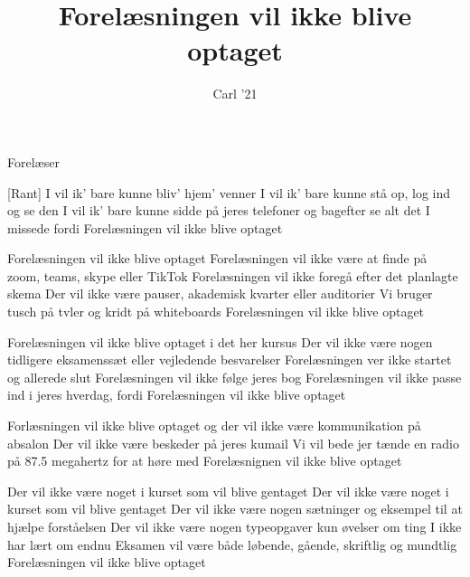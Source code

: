 \documentclass[a4paper,11pt]{article}
\title{Forelæsningen vil ikke blive optaget}
\author{Carl '21}
\begin{document}
\maketitle

\begin{roles}
 Forelæser
\end{roles}


\begin{song}


[Rant] I vil ik' bare kunne bliv' hjem' venner
    I vil ik' bare kunne stå op, log ind og se den
    I vil ik' bare kunne sidde på jeres telefoner
    og bagefter se alt det I missede fordi
    Forelæsningen vil ikke blive optaget

    Forelæsningen vil ikke blive optaget
    Forelæsningen vil ikke være at finde på zoom, teams, skype eller TikTok
    Forelæsningen vil ikke foregå efter det planlagte skema
    Der vil ikke være pauser, akademisk kvarter eller auditorier
    Vi bruger tusch på tvler og kridt på whiteboards
    Forelæsningen vil ikke blive optaget

    Forelæsningen vil ikke blive optaget i det her kursus
    Der vil ikke være nogen tidligere eksamenssæt eller vejledende besvarelser
    Forelæsningen ver ikke startet og allerede slut
    Forelæsningen vil ikke følge jeres bog
    Forelæsningen vil ikke passe ind i jeres hverdag, fordi
    Forelæsningen vil ikke blive optaget

    Forlæsningen vil ikke blive optaget og der vil ikke være kommunikation på absalon
    Der vil ikke være beskeder på jeres kumail
    Vi vil bede jer tænde en radio på 87.5 megahertz for at høre med
    Forelæsnignen vil ikke blive optaget

    Der vil ikke være noget i kurset som vil blive gentaget
    Der vil ikke være noget i kurset som vil blive gentaget
    Der vil ikke være nogen sætninger og eksempel til at hjælpe forståelsen
    Der vil ikke være nogen typeopgaver kun øvelser om ting I ikke har lært om endnu
    Eksamen vil være både løbende, gående, skriftlig og mundtlig
    Forelæsningen vil ikke blive optaget


\end{song}
\end{document}
